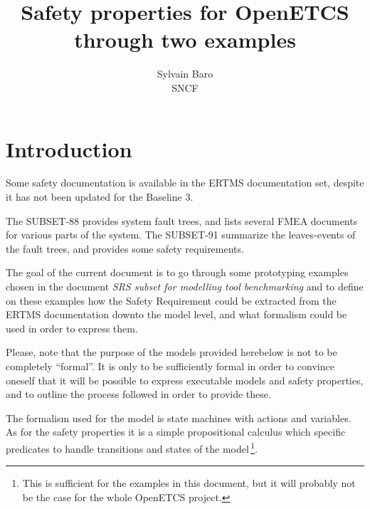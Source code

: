 \documentclass{template/openetcs_article}
\begin{document}
\frontmatter
{}

\title{Safety properties for OpenETCS through two examples}





\author{Sylvain Baro\\SNCF}

  
  


\maketitle

\section{Introduction}
Some safety documentation is available in the ERTMS documentation set, despite it has not been 
updated for the Baseline 3.

The SUBSET-88 provides system fault trees, and lists several FMEA documents for various parts 
of the system. The SUBSET-91 summarize the leaves-events of the fault trees, and provides some safety
requirements.

The goal of the current document is to go through some prototyping examples chosen in the document 
\emph{SRS subset for modelling tool benchmarking} and to define on these examples how the Safety 
Requirement could be extracted from the ERTMS documentation downto the model level, and what 
formalism could be used in order to express them.

Please, note that the purpose of the models provided herebelow is not to be completely ``formal''. 
It is only to be sufficiently formal in order to convince oneself that it will be possible to express
executable models and safety properties, and to outline the process followed in order to provide these.

The formalism used for the model is state machines with actions and variables. As for the safety
properties it is a simple propositional calculus which specific predicates to handle transitions 
and states of the model\,\footnote{This is sufficient for the examples in this document, but it 
will probably not be the case for the whole OpenETCS project.}. 
\end{document}
